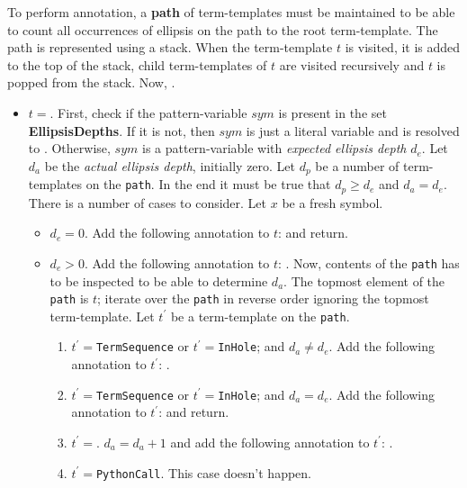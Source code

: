 To perform annotation, a \textbf{path} of term-templates must be maintained to be able to count all occurrences of ellipsis on the path to the root term-template. The path is represented using a stack. When the term-template $t$ is visited, it is added to the top of the stack, child term-templates of $t$ are visited recursively and $t$ is popped from the stack. Now, .
\begin{itemize}

\item
	$t=$\TermUnresolvedSymbol. First, check if the pattern-variable $\mathit{sym}$ is present in the set \textbf{EllipsisDepths}. If it is not, then $sym$ is just a literal variable and is resolved to \TermLiteral[Variable][$sym$][false].
Otherwise, $sym$ is a pattern-variable with \textit{expected ellipsis depth} $d_e$. Let $d_a$ be the \textit{actual ellipsis depth}, initially zero. Let $d_p$ be a number of \RepeatNoArg \space term-templates on the \texttt{path}. In the end it must be true that $d_p \geq d_e$ and $d_a = d_e$. There is a number of cases to consider. Let $x$ be a fresh symbol.
	\begin{itemize}
	\item
	$d_e=0$. Add the following annotation to $t$:  and return.
	\item
	$d_e>0$. Add the following annotation to $t$: . Now, contents of the \texttt{path} has to be inspected to be able to determine $d_a$. The topmost element of the \texttt{path} is $t$; iterate over the \texttt{path} in reverse order ignoring the topmost term-template. Let $t^{\prime}$ be a term-template on the \texttt{path}.
		\begin{enumerate}
		\item
		$t^{\prime}=$\space \texttt{TermSequence} or $t^{\prime}=$\space \texttt{InHole}; and $d_a \neq d_e$. Add the following annotation to $t^{\prime}$: .
		\item
		$t^{\prime}=$\space \texttt{TermSequence} or $t^{\prime}=$\space \texttt{InHole}; and $d_a = d_e$.  Add the following annotation to $t^{\prime}$:  and return.
		\item
		$t^{\prime}=$\space \RepeatNoArg. $d_a = d_a + 1$ and add the following annotation to $t^{\prime}$: .
		\item
		$t^{\prime}=$\space \texttt{PythonCall}. This case doesn't happen.

\end{enumerate}
\end{itemize}
\end{itemize}
